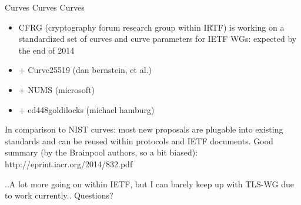 \begin{frame}{Curves Curves Curves}
  \begin{itemize}
    \item CFRG (cryptography forum research group within IRTF) is working on a standardized set of curves and curve parameters for IETF WGs: expected by the end of 2014
    \item + Curve25519 (dan bernstein, et al.)
    \item + NUMS (microsoft)
    \item + ed448goldilocks (michael hamburg)
  \end{itemize}
In comparison to NIST curves: most new proposals are plugable into existing standards and can be reused within protocols and IETF documents.
\newline
\newline
Good summary (by the Brainpool authors, so a bit biased): http://eprint.iacr.org/2014/832.pdf
\end{frame}

\begin{frame}
..A lot more going on within IETF, but I can barely keep up with TLS-WG due to work currently..
\newline
\newline
Questions?
\end{frame}
